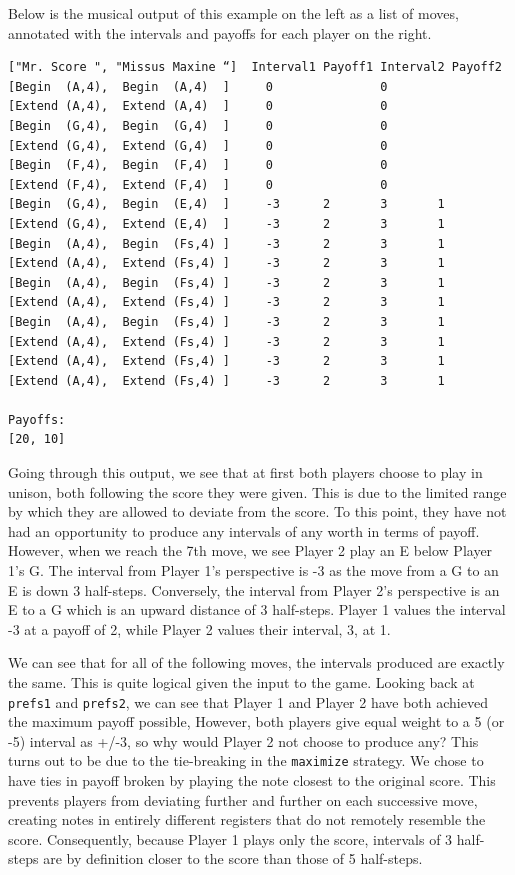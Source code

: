 \documentclass{article}
\begin{document}
Below is the musical output of this example on the left as a list of
moves, annotated with the intervals and payoffs for each player on the
right.

\begin{verbatim}
["Mr. Score ", "Missus Maxine “]  Interval1 Payoff1 Interval2 Payoff2
[Begin  (A,4),  Begin  (A,4)  ]     0               0        
[Extend (A,4),  Extend (A,4)  ]     0               0        
[Begin  (G,4),  Begin  (G,4)  ]     0               0        
[Extend (G,4),  Extend (G,4)  ]     0               0        
[Begin  (F,4),  Begin  (F,4)  ]     0               0        
[Extend (F,4),  Extend (F,4)  ]     0               0        
[Begin  (G,4),  Begin  (E,4)  ]     -3      2       3       1
[Extend (G,4),  Extend (E,4)  ]     -3      2       3       1
[Begin  (A,4),  Begin  (Fs,4) ]     -3      2       3       1
[Extend (A,4),  Extend (Fs,4) ]     -3      2       3       1
[Begin  (A,4),  Begin  (Fs,4) ]     -3      2       3       1
[Extend (A,4),  Extend (Fs,4) ]     -3      2       3       1
[Begin  (A,4),  Begin  (Fs,4) ]     -3      2       3       1
[Extend (A,4),  Extend (Fs,4) ]     -3      2       3       1
[Extend (A,4),  Extend (Fs,4) ]     -3      2       3       1
[Extend (A,4),  Extend (Fs,4) ]     -3      2       3       1

Payoffs:
[20, 10]
\end{verbatim}

Going through this output, we see that at first both players choose to
play in unison, both following the score they were given. This is due to
the limited range by which they are allowed to deviate from the score.
To this point, they have not had an opportunity to produce any intervals
of any worth in terms of payoff. However, when we reach the 7th move, we
see Player 2 play an E below Player 1's G. The interval from Player 1's 
perspective is -3 as the move from a G to an E is down 3 half-steps. 
Conversely, the interval from Player 2's perspective is an E to a G which is 
an upward distance of 3 half-steps.  Player 1 values the interval -3 at a 
payoff of 2, while Player 2 values their interval, 3, at 1.

We can see that for all of the following moves, the intervals produced
are exactly the same. This is quite logical given the input to the game.
Looking back at \texttt{prefs1} and \texttt{prefs2}, we can see that Player 1 and Player 2
have both achieved the maximum payoff possible,
However, both players give equal weight to a 5 (or -5) interval as +/-3,
so why would Player 2 not choose to produce any? This turns out to be due
to the tie-breaking in the \texttt{maximize} strategy. We chose to have ties in
payoff broken by playing the note closest to the original score. This
prevents players from deviating further and further on each successive move,
creating notes in entirely different registers that do not remotely
resemble the score. Consequently, because Player 1 plays only the score,
intervals of 3 half-steps are by definition closer to the score than
those of 5 half-steps.
\end{document}
